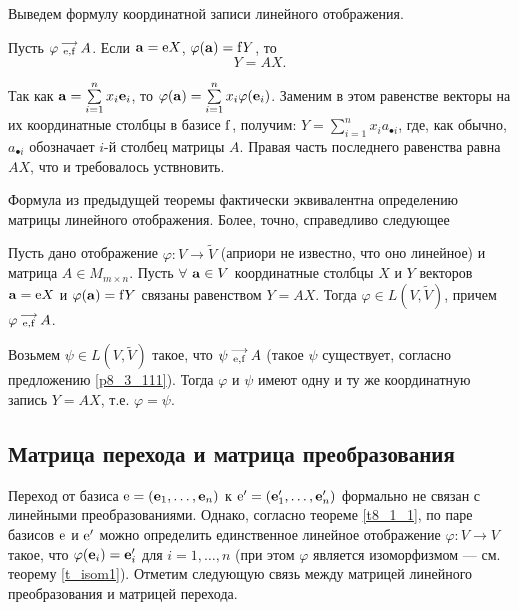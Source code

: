 \otstup 

Выведем формулу координатной записи линейного отображения.

\begin{theor}\label{t8_3_1}
Пусть $\varphi \begin{smallmatrix} \longrightarrow \\ \mathrm{e}, \mathrm{f} \end{smallmatrix} A$.
Если $\mathbf{a} = \mathrm{e} X$, $\varphi (\mathbf{a}) = \mathrm{f} Y$, то 
$$\boxed{Y=AX}.$$
\end{theor}
\dok Так как $\mathbf{a} = \sum\limits_{i=1}^n x_i \mathbf{e}_i$, 
то $\varphi (\mathbf{a}) = \sum\limits_{i=1}^n x_i \varphi(\mathbf{e}_i)$. Заменим в этом равенстве векторы на их координатные
столбцы в базисе $\mathrm{f}$, получим:
$Y= \sum\limits_{i=1}^n x_i a_{\bullet i}$, где, как обычно, $a_{\bullet i}$ обозначает $i$-й столбец матрицы $A$.
Правая часть последнего равенства равна $AX$, что и требовалось уствновить.
\edok

\otstup

Формула из предыдущей теоремы фактически эквивалентна определению матрицы линейного отображения.
Более, точно, справедливо следующее %
%
\begin{sled}
Пусть дано 
отображение $\varphi :V\to \widetilde{V}$ (априори не известно, что оно линейное) 
и матрица $A \in M_{m\times n}$.
Пусть $\forall$ $\mathbf{a} \in V$ координатные столбцы $X$ и $Y$ векторов
$\mathbf{a} = \mathrm{e} X$ и $\varphi (\mathbf{a}) = \mathrm{f} Y$ связаны 
равенством $Y=AX$. Тогда $\varphi \in L(V, \widetilde{V})$, причем
$\varphi \begin{smallmatrix} \longrightarrow \\ \mathrm{e}, \mathrm{f} \end{smallmatrix} A$.
\end{sled}
\dok Возьмем $\psi \in L(V, \widetilde{V})$ такое, что $\psi \begin{smallmatrix} \longrightarrow \\ \mathrm{e}, \mathrm{f} \end{smallmatrix} A$ (такое 
$\psi$ существует, согласно предложению \ref{p8_3_111}). Тогда $\varphi$ и $\psi$ имеют одну и ту же координатную запись $Y=AX$, т.е. 
$\varphi = \psi$.
\edok

\subsection{Матрица перехода и матрица преобразования}

Переход от базиса $\mathrm{e}=(\mathbf{e}_1, \ldots, \mathbf{e}_n)$ к $\mathrm{e}'=(\mathbf{e}'_1, \ldots, \mathbf{e}'_n)$  
формально не связан с  линейными преобразованиями. Однако, согласно теореме \ref{t8_1_1}, 
по паре базисов $\mathrm{e}$ и $\mathrm{e}'$ можно определить единственное линейное отображение 
$\varphi: V\to V$ такое, что $\varphi (\mathbf{e}_i) = \mathbf{e}'_i$ для $i=1, \ldots, n$
(при этом $\varphi $ является  изоморфизмом --- см. теорему \ref{t_isom1}). 
Отметим следующую связь между матрицей линейного преобразования и матрицей перехода.


